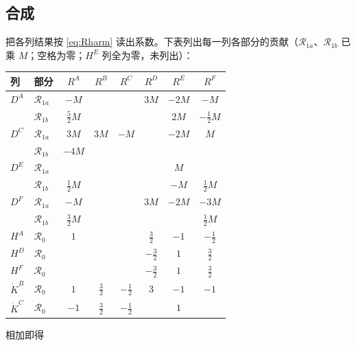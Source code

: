 \documentclass[11pt,a4paper]{ctexart}
\numberwithin{equation}{section}
\begin{document}
\subsection{合成}

把各列结果按 \eqref{eq:Rharm} 读出系数。下表列出每一列各部分的贡献（$\mathcal R_{1a}$、$\mathcal R_{1b}$ 已乘 $M$；空格为零；$H^E$ 列全为零，未列出）：
\begin{center}\small
\begin{tabular}{l|l|cccccc}
\hline
列 & 部分 & $R^A$ & $R^B$ & $R^C$ & $R^D$ & $R^E$ & $R^F$\\
\hline
$D^A$ & $\mathcal R_{1a}$ & $-M$ & & & $3M$ & $-2M$ & $-M$\\
 & $\mathcal R_{1b}$ & $\tfrac52M$ & & & & $2M$ & $-\tfrac12M$\\
$D^C$ & $\mathcal R_{1a}$ & $3M$ & $3M$ & $-M$ & & $-2M$ & $M$\\
 & $\mathcal R_{1b}$ & $-4M$ & & & & & \\
$D^E$ & $\mathcal R_{1a}$ & & & & & $M$ & \\
 & $\mathcal R_{1b}$ & $\tfrac12M$ & & & & $-M$ & $\tfrac12M$\\
$D^F$ & $\mathcal R_{1a}$ & $-M$ & & & $3M$ & $-2M$ & $-3M$\\
 & $\mathcal R_{1b}$ & $\tfrac32M$ & & & & & $\tfrac12M$\\
\hline
$H^A$ & $\mathcal R_0$ & $1$ & & & $\tfrac32$ & $-1$ & $-\tfrac12$\\
$H^D$ & $\mathcal R_0$ & & & & $-\tfrac32$ & $1$ & $\tfrac32$\\
$H^F$ & $\mathcal R_0$ & & & & $-\tfrac32$ & $1$ & $\tfrac32$\\
$\dot K^B$ & $\mathcal R_0$ & $1$ & $\tfrac32$ & $-\tfrac12$ & $3$ & $-1$ & $-1$\\
$\dot K^C$ & $\mathcal R_0$ & $-1$ & $\tfrac32$ & $-\tfrac12$ & & $1$ & \\
\hline
\end{tabular}
\end{center}
相加即得
\end{document}

